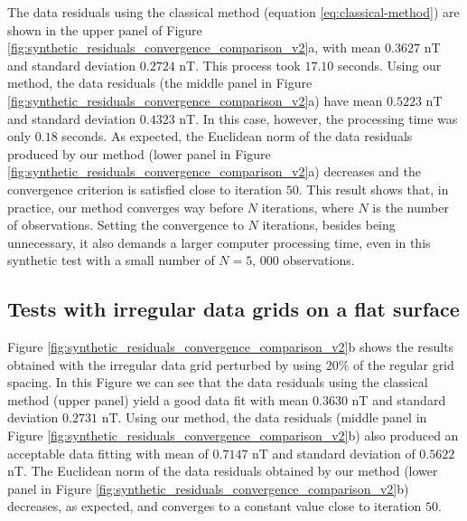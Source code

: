 \documentclass[manuscript]{geophysics}
\begin{document}
	The data residuals using the classical method (equation \ref{eq:classical-method})  
	are shown in the upper panel of Figure \ref{fig:synthetic_residuals_convergence_comparison_v2}a, 
	with mean $0.3627$ nT and standard deviation $0.2724$ nT. This process took $17.10$ seconds.
	Using our method, the data residuals (the middle panel in Figure
	\ref{fig:synthetic_residuals_convergence_comparison_v2}a) have mean $0.5223$ nT and standard
	deviation $0.4323$ nT. In this case, however, the processing time was only $0.18$ seconds.
	As expected, the Euclidean norm of the data residuals produced by our method 
	(lower panel in Figure \ref{fig:synthetic_residuals_convergence_comparison_v2}a) decreases 
	and the convergence criterion is satisfied close to iteration $50$. 
	This result shows that, in practice, our method converges way before $N$ iterations,
	where $N$ is the number of observations.
	Setting the convergence to $N$ iterations, besides being unnecessary, it also demands a larger 
	computer processing time, even in this synthetic test with a small number 
	of $N = 5,\, 000$ observations.
	
	\subsection*{Tests with irregular data grids on a flat surface}
	
	Figure \ref{fig:synthetic_residuals_convergence_comparison_v2}b shows the results obtained
	with the irregular data grid perturbed by using $20\%$ of the regular grid spacing.
	In this Figure we can see that the data residuals 
	using the classical method (upper panel) yield a good data fit with mean $0.3630$ nT and standard
	deviation $0.2731$ nT. 
	Using our method, the data residuals (middle panel in Figure 
	\ref{fig:synthetic_residuals_convergence_comparison_v2}b) also produced an acceptable data 
	fitting with mean of  $0.7147$ nT and standard deviation of $0.5622$ nT. 
	The Euclidean norm of the data residuals obtained by our method 
	(lower panel in Figure \ref{fig:synthetic_residuals_convergence_comparison_v2}b) decreases, 
	as expected, and converges to a constant value close to iteration $50$. 
	
\end{document}
